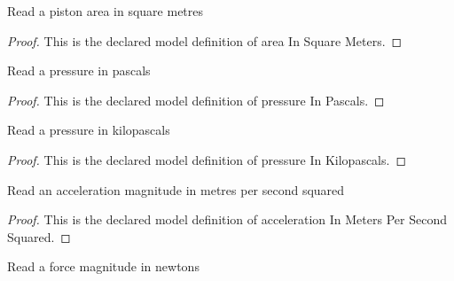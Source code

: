 \begin{definition}
  \label{def:physics:phyx-mini-0463:phyxminiproblems-problemphyxmini0463-areainsquaremeters}
  Read a piston area in square metres
\end{definition}
\begin{proof}
  This is the declared model definition of area In Square Meters.
\end{proof}
\begin{definition}
  \label{def:physics:phyx-mini-0463:phyxminiproblems-problemphyxmini0463-pressureinpascals}
  Read a pressure in pascals
\end{definition}
\begin{proof}
  This is the declared model definition of pressure In Pascals.
\end{proof}
\begin{definition}
  \label{def:physics:phyx-mini-0463:phyxminiproblems-problemphyxmini0463-pressureinkilopascals}
  Read a pressure in kilopascals
\end{definition}
\begin{proof}
  This is the declared model definition of pressure In Kilopascals.
\end{proof}
\begin{definition}
  \label{def:physics:phyx-mini-0463:phyxminiproblems-problemphyxmini0463-accelerationinmeterspersecondsquared}
  Read an acceleration magnitude in metres per second squared
\end{definition}
\begin{proof}
  This is the declared model definition of acceleration In Meters Per Second Squared.
\end{proof}
\begin{definition}
  \label{def:physics:phyx-mini-0463:phyxminiproblems-problemphyxmini0463-forceinnewtons}
  Read a force magnitude in newtons
\end{definition}
